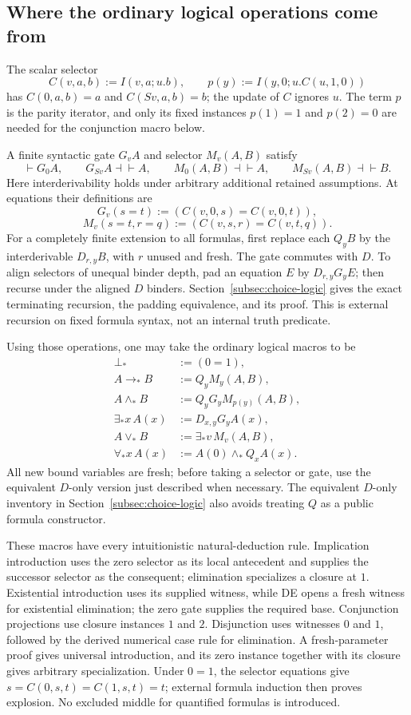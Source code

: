 \documentclass[11pt,letterpaper]{article}
\theoremstyle{definition}
\theoremstyle{remark}
\begin{document}
\subsection{Where the ordinary logical operations come from}

The scalar selector
\[
 C(v,a,b):=I(v,a;u.b),\qquad
 p(y):=I(y,0;u.C(u,1,0))
\]
has $C(0,a,b)=a$ and $C(Sv,a,b)=b$; the update of $C$ ignores $u$.
The term $p$ is the parity iterator, and only its fixed instances
$p(1)=1$ and $p(2)=0$ are needed for the conjunction macro below.

A finite syntactic gate $G_vA$ and selector $M_v(A,B)$ satisfy
\[
 \vdash G_0A,\qquad G_{Sv}A\dashv\vdash A,
 \qquad M_0(A,B)\dashv\vdash A,
 \qquad M_{Sv}(A,B)\dashv\vdash B.
\]
Here interderivability holds under arbitrary additional retained assumptions.
At equations their definitions are
\[
 G_v(s=t):=(C(v,0,s)=C(v,0,t)),
\]
\[
 M_v(s=t,r=q):=(C(v,s,r)=C(v,t,q)).
\]
For a completely finite extension to all formulas, first replace each
$Q_yB$ by the interderivable $D_{r,y}B$, with $r$ unused and fresh.
The gate commutes with $D$. To align selectors of unequal binder depth,
pad an equation $E$ by $D_{r,y}G_yE$; then recurse under the aligned $D$
binders. Section~\ref{subsec:choice-logic} gives the exact terminating
recursion, the padding equivalence, and its proof. This is external recursion
on fixed formula syntax, not an internal truth predicate.

Using those operations, one may take the ordinary logical macros to be
\[
\begin{aligned}
 \bot_*&:=(0=1),\\
 A\mathbin{\to_*}B&:=Q_yM_y(A,B),\\
 A\mathbin{\wedge_*}B&:=Q_yG_yM_{p(y)}(A,B),\\
 \exists_*x\,A(x)&:=D_{x,y}G_yA(x),\\
 A\mathbin{\vee_*}B&:=\exists_*v\,M_v(A,B),\\
 \forall_*x\,A(x)&:=A(0)\mathbin{\wedge_*}Q_xA(x).
\end{aligned}
\]
All new bound variables are fresh; before taking a selector or gate, use
the equivalent $D$-only version just described when necessary.
The equivalent $D$-only inventory in Section~\ref{subsec:choice-logic}
also avoids treating $Q$ as a public formula constructor.

These macros have every intuitionistic natural-deduction rule. Implication
introduction uses the zero selector as its local antecedent and supplies the
successor selector as the consequent; elimination specializes a closure at
$1$. Existential introduction uses its supplied witness, while DE opens a
fresh witness for existential elimination; the zero gate supplies the required
base. Conjunction projections use closure instances $1$ and $2$. Disjunction
uses witnesses $0$ and $1$, followed by the derived numerical case rule for
elimination. A fresh-parameter proof gives universal introduction, and its
zero instance together with its closure gives arbitrary specialization.
Under $0=1$, the selector equations give
$s=C(0,s,t)=C(1,s,t)=t$; external formula induction then proves explosion.
No excluded middle for quantified formulas is introduced.
\end{document}
